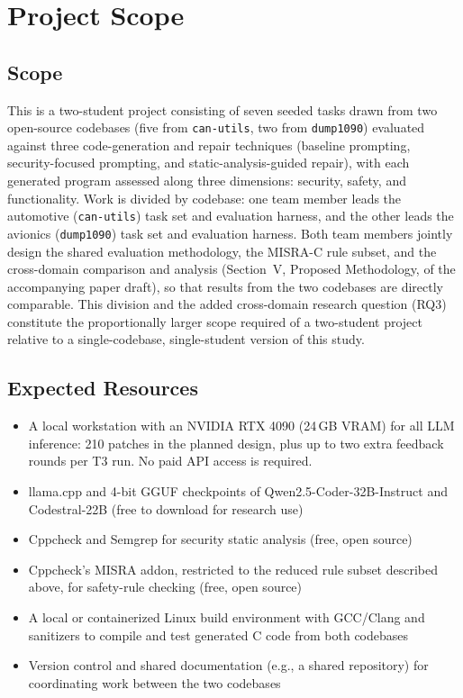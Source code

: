 \documentclass[12pt]{article}
\begin{document}
\section{Project Scope}

\subsection{Scope}
This is a two-student project consisting of seven seeded tasks drawn from two open-source codebases (five from \texttt{can-utils}, two from \texttt{dump1090}) evaluated against three code-generation and repair techniques (baseline prompting, security-focused prompting, and static-analysis-guided repair), with each generated program assessed along three dimensions: security, safety, and functionality. Work is divided by codebase: one team member leads the automotive (\texttt{can-utils}) task set and evaluation harness, and the other leads the avionics (\texttt{dump1090}) task set and evaluation harness. Both team members jointly design the shared evaluation methodology, the MISRA-C rule subset, and the cross-domain comparison and analysis (Section~V, Proposed Methodology, of the accompanying paper draft), so that results from the two codebases are directly comparable. This division and the added cross-domain research question (RQ3) constitute the proportionally larger scope required of a two-student project relative to a single-codebase, single-student version of this study.

\subsection{Expected Resources}
\begin{itemize}
    \item A local workstation with an NVIDIA RTX 4090 (24\,GB VRAM) for all LLM inference: 210 patches in the planned design, plus up to two extra feedback rounds per T3 run. No paid API access is required.
    \item llama.cpp and 4-bit GGUF checkpoints of Qwen2.5-Coder-32B-Instruct and Codestral-22B (free to download for research use)
    \item Cppcheck and Semgrep for security static analysis (free, open source)
    \item Cppcheck's MISRA addon, restricted to the reduced rule subset described above, for safety-rule checking (free, open source)
    \item A local or containerized Linux build environment with GCC/Clang and sanitizers to compile and test generated C code from both codebases
    \item Version control and shared documentation (e.g., a shared repository) for coordinating work between the two codebases
\end{itemize}
\end{document}
